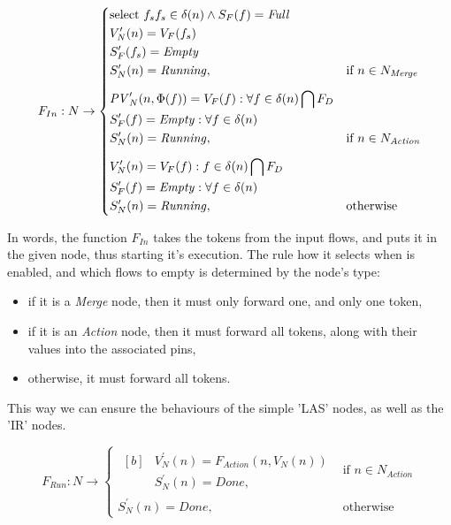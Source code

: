 \begin{definition}
\begin{equation}
	F_{In} : N \rightarrow
	\begin{cases}
		\begin{aligned}[b]
			&\text{select } f_s f_s \in \delta(n) \wedge S_F(f) = \mathit{Full} \\
			&V_N^\prime(n) = V_F(f_s) \\
			&S_F^\prime(f_s) = \mathit{Empty} \\
			&S_N^\prime(n) = \mathit{Running},
		\end{aligned} & \text{if } n \in N_\mathit{Merge} \\[8pt]
		\begin{aligned}[b]
			&\mathit{PV}_N^\prime(n, \Phi(f)) = V_F(f) : \forall f \in \delta(n) \bigcap F_D \\
			&S_F^\prime(f) = \mathit{Empty} : \forall f \in \delta(n) \\
			&S_N^\prime(n) = \mathit{Running},
		\end{aligned} & \text{if } n \in N_\mathit{Action} \\[8pt]
		\begin{aligned}[b]
			&V_N^\prime(n) = V_F(f) : f \in \delta(n) \bigcap F_D \\
			&S_F^\prime(f) = \mathit{Empty} : \forall f \in \delta(n) \\
			&S_N^\prime(n) = \mathit{Running},
		\end{aligned} & \text{otherwise}
	\end{cases}
\end{equation}

In words, the function \(F_{In}\) takes the tokens from the input flows, and puts it in the given node, thus starting it's execution. The rule how it selects when is enabled, and which flows to empty is determined by the node's type:

\begin{itemize}
	\item if it is a \emph{Merge} node, then it must only forward one, and only one token,
	\item if it is an \emph{Action} node, then it must forward all tokens, along with their values into the associated pins,
	\item otherwise, it must forward all tokens.
\end{itemize}

This way we can ensure the behaviours of the simple 'LAS' nodes, as well as the 'IR' nodes.

\begin{equation}
	F_{Run} : N \rightarrow
	\begin{cases}
		\begin{aligned}[b]
			&V_N^\prime(n) = F_{Action}(n, V_N(n)) \\
			&S_N^\prime(n) = \mathit{Done},
		\end{aligned} & \text{if } n \in N_{Action} \\[8pt]
		S_N^\prime(n) = \mathit{Done}, & \text{otherwise}
	\end{cases}
\end{equation}


\end{definition}
